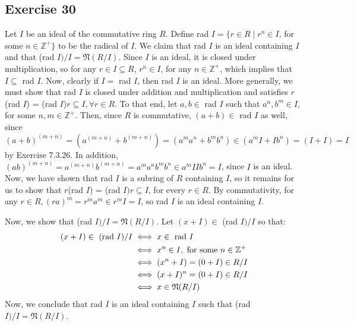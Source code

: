 \subsection*{Exercise 30}
Let $I$ be an ideal of the commutative ring $R$. Define rad $I = \{r \in R \mid r^n \in I$, for some $n \in \mathbb{Z}^+\}$ to be the radical of $I$. We claim that rad $I$ is an ideal containing $I$ and that (rad $I)/I = \mathfrak{N}(R/I)$. Since $I$ is an ideal, it is closed under multiplication, so for any $r \in I \subseteq R$, $r^n \in I$, for any $n \in \mathbb{Z}^+$, which implies that $I \subseteq$ rad $I$. Now, clearly if $I =$ rad $I$, then rad $I$ is an ideal. More generally, we must show that rad $I$ is closed under addition and multiplication and satisfies $r$(rad $I$) = (rad $I$)$r \subseteq I, \forall r \in R$. To that end, let $a,b  \in$ rad $I$ such that $a^n, b^m \in I$, for some $n,m \in \mathbb{Z}^+$. Then, since $R$ is commutative, $(a + b) \in$ rad $I$ as well, since $(a + b)^{(m+n)} = (a^{(m+n)} + b^{(m+n)}) = (a^ma^n + b^mb^n) \in (a^mI + Ib^n) = (I + I) = I$ by Exercise 7.3.26. In addition, $(ab)^{(m+n)} = a^{(m+n)}b^{(m+n)} = a^ma^nb^mb^n \in a^mIIb^n = I$, since $I$ is an ideal. Now, we have shown that rad $I$ is a subring of $R$ containing $I$, so it remains for us to show that $r$(rad $I$) = (rad $I)r \subseteq I$, for every $r \in R$. By commutativity, for any $r \in R, (ra)^m = r^ma^m \in r^mI = I$, so rad $I$ is an ideal containing $I$.

Now, we show that (rad $I)/I = \mathfrak{N}(R/I)$. Let $(x + I) \in$ (rad $I)/I$ so that:
\begin{align*}
    (x + I) \in \textnormal{ (rad } I)/I &\iff x \in \textnormal{ rad } I \\
    &\iff x^n \in I, \textnormal{ for some } n \in \mathbb{Z}^+ \\
    &\iff (x^n + I) = (0 + I) \in R/I \\
    &\iff (x + I)^n = (0 + I) \in R/I \\
    &\iff x \in \mathfrak{N}(R/I)
\end{align*}
Now, we conclude that rad $I$ is an ideal containing $I$ such that (rad $I)/I = \mathfrak{N}(R/I)$.
